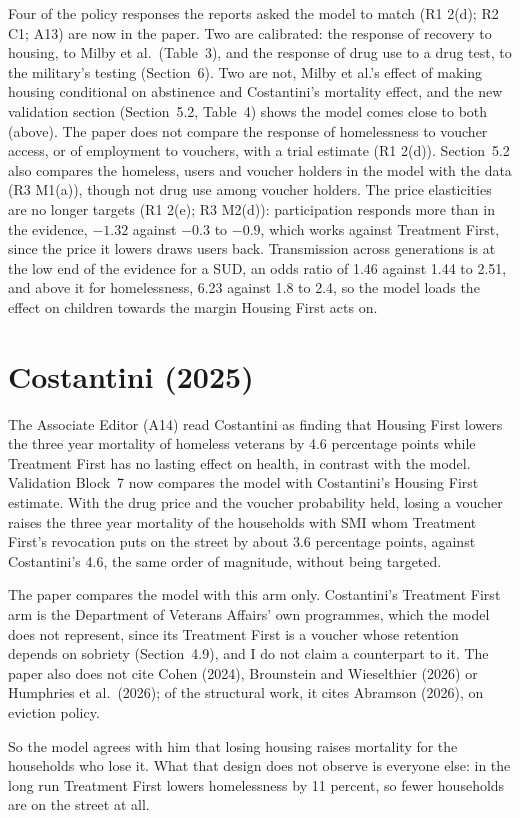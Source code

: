 \documentclass[11pt]{article}
\begin{document}
{Four of the policy responses the reports asked the model to match (R1 2(d); R2 C1; A13) are
now in the paper. Two are calibrated: the response of recovery to housing, to Milby et al.\
(Table~3), and the response of drug use to a drug test, to the military's testing (Section~6).
Two are not, Milby et al.'s effect of making housing conditional on abstinence and
Costantini's mortality effect, and the new validation section (Section~5.2, Table~4) shows the
model comes close to both (above). \open The paper does not compare the
response of homelessness to voucher access, or of employment to vouchers, with a trial
estimate (R1 2(d)). Section~5.2 also compares the homeless, users and voucher holders in the
model with the data (R3 M1(a)), though not drug use among voucher holders. The price
elasticities are no longer targets (R1 2(e); R3 M2(d)): participation responds more than in the
evidence, $-1.32$ against $-0.3$ to $-0.9$, which works against Treatment First, since the price
it lowers draws users back. Transmission across generations is at the low end of the evidence
for a SUD, an odds ratio of 1.46 against 1.44 to 2.51, and above it for homelessness, 6.23
against 1.8 to 2.4, so the model loads the effect on children towards the margin Housing First
acts on.
}

\section*{\color{respred}Costantini (2025)}

{\color{respred}
The Associate Editor (A14) read Costantini as finding that Housing First lowers the three
year mortality of homeless veterans by 4.6 percentage points while Treatment First has no
lasting effect on health, in contrast with the model. Validation Block~7 now compares the model with Costantini's Housing First estimate. With the drug price and the voucher probability held, losing a
voucher raises the three year mortality of the households with SMI whom Treatment First's
revocation puts on the street by about 3.6 percentage points, against Costantini's 4.6, the same order
of magnitude, without being targeted.

\open The paper compares the model with this arm only. Costantini's Treatment First arm is the
Department of Veterans Affairs' own programmes, which the model does not represent, since its
Treatment First is a voucher whose retention depends on sobriety (Section~4.9), and I do not
claim a counterpart to it. The paper also does not cite Cohen (2024), Brounstein and
Wieselthier (2026) or Humphries et al.\ (2026); of the structural work, it cites Abramson
(2026), on eviction policy.

So the model agrees with him that losing housing raises mortality for the households who lose
it. What that design does not observe is everyone else: in the long run Treatment First lowers
homelessness by 11 percent, so fewer households are on the street at all.
}
\end{document}
